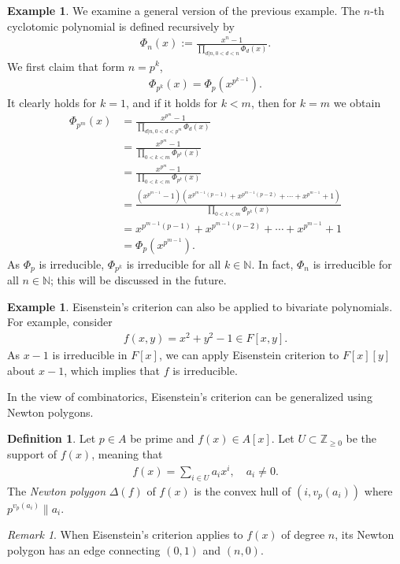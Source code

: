 \documentclass[12pt]{report}
\theoremstyle{plain}
\theoremstyle{remark}
\newtheorem*{remark}{Remark}
\theoremstyle{definition}
\newtheorem{definition}[theorem]{Definition}
\newtheorem{example}[theorem]{Example}
\newcommand{\N}{\mathbb{N}}
\newcommand{\Z}{\mathbb{Z}}
\begin{document}
\begin{example}
    We examine a general version of the previous example. The $n$-th cyclotomic polynomial is defined recursively by
    \begin{align*}
        \Phi_n(x) := \frac{x^n-1}{\prod_{d|n,0<d<n}\Phi_d(x)}.
    \end{align*}
    We first claim that form $n=p^k$,
    \begin{align*}
        \Phi_{p^k}(x) = \Phi_p(x^{p^{k-1}}).
    \end{align*}
    It clearly holds for $k=1$, and if it holds for $k<m$, then for $k=m$ we obtain
    \begin{align*}
        \Phi_{p^m}(x) &= \frac{x^{p^m}-1}{\prod_{d|n,0<d<p^m}\Phi_d(x)} \\
        &= \frac{x^{p^m}-1}{\prod_{0<k<m}\Phi_{p^k}(x)} \\
        &= \frac{x^{p^m}-1}{\prod_{0<k<m}\Phi_{p^k}(x)} \\
        &= \frac{\left(x^{p^{m-1}}-1\right)\left(x^{p^{m-1}(p-1)}+x^{p^{m-1}(p-2)}+\cdots+x^{p^{m-1}}+1\right)}{\prod_{0<k<m}\Phi_{p^k}(x)} \\
        &= x^{p^{m-1}(p-1)}+x^{p^{m-1}(p-2)}+\cdots+x^{p^{m-1}}+1 \\
        &= \Phi_{p}(x^{p^{m-1}}).
    \end{align*}
    As $\Phi_{p}$ is irreducible, $\Phi_{p^k}$ is irreducible for all $k\in\N$. In fact, $\Phi_n$ is irreducible for all $n\in\N$; this will be discussed in the future.
\end{example}

\begin{example}
    Eisenstein's criterion can also be applied to bivariate polynomials. For example, consider
    \begin{align*}
        f(x,y)=x^2+y^2-1\in F[x,y].
    \end{align*}
    As $x-1$ is irreducible in $F[x]$, we can apply Eisenstein criterion to $F[x][y]$ about $x-1$, which implies that $f$ is irreducible.
\end{example}

In the view of combinatorics, Eisenstein's criterion can be generalized using Newton polygons.

\begin{definition}
    Let $p\in A$ be prime and $f(x)\in A[x]$. Let $U\subset \Z_{\ge 0}$ be the support of $f(x)$, meaning that
    \begin{align*}
        f(x) = \sum_{i\in U} a_ix^i,\quad a_i\neq 0.
    \end{align*}
    The \emph{Newton polygon} $\Delta (f)$ of $f(x)$ is the convex hull of $(i,v_p(a_i))$ where $p^{v_p(a_i)}\|a_i$.
\end{definition}
\begin{remark}
    When Eisenstein's criterion applies to $f(x)$ of degree $n$, its Newton polygon has an edge connecting $(0,1)$ and $(n,0)$.
\end{remark}
\end{document}
